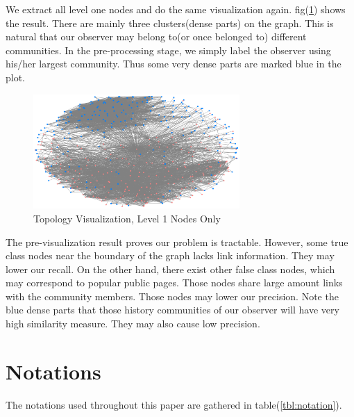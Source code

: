 \documentclass[11pt,a4paper]{article}
\begin{document}
We extract all level one nodes and do the same visualization again. 
fig(\ref{fig:topo_vis_l1}) shows the result. There are mainly three
clusters(dense parts) on the graph. This is natural that our observer
may belong to(or once belonged to) different communities. In the 
pre-processing stage, we simply label the observer using his/her 
largest community. Thus some very dense parts are marked blue in 
the plot.  

\begin{figure}[htb]
	\centering
	\includegraphics[width=0.7\textwidth]{../visualization/NodeXL_ClassNo.png}
	\caption{Topology Visualization, Level 1 Nodes Only}
	\label{fig:topo_vis_l1}
\end{figure}

The pre-visualization result proves our problem is tractable. However, 
some true class nodes near the boundary of the graph lacks link information. 
They may lower our recall. On the other hand, there exist other false class 
nodes, which may correspond to popular public pages. Those nodes share 
large amount links with the community members. Those nodes may lower
our precision. Note the blue dense parts that those history communities
of our observer will have very high similarity measure. They may also
cause low precision. 

\section{Notations}

The notations used throughout this paper are gathered 
in table(\ref{tbl:notation}). 
\end{document}
